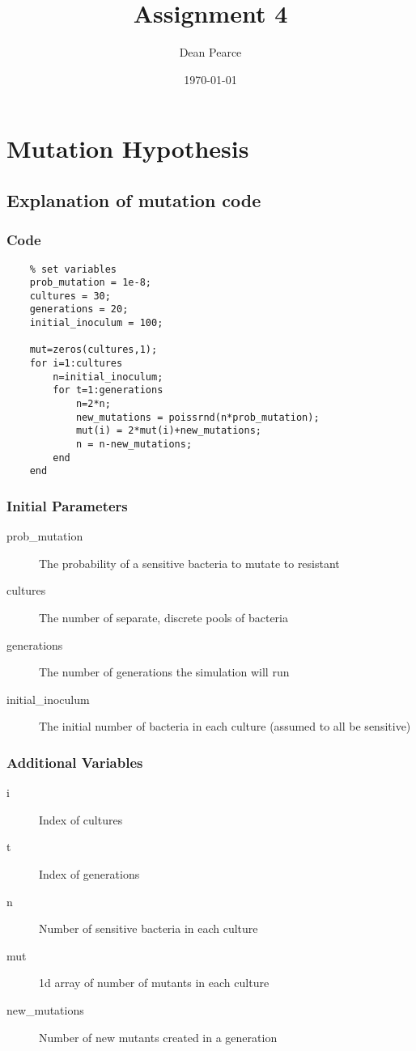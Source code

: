\documentclass[titlepage]{scrreprt}
\title{Assignment 4}
\date{\today}
\author{Dean Pearce}
\begin{document}
\maketitle
\tableofcontents
\clearpage
\chapter{Mutation Hypothesis}
\section{Explanation of mutation code}
\subsection{Code}
\begin{verbatim}
    % set variables
    prob_mutation = 1e-8;
    cultures = 30;
    generations = 20;
    initial_inoculum = 100;
    
    mut=zeros(cultures,1);
    for i=1:cultures
        n=initial_inoculum;
        for t=1:generations
            n=2*n;
            new_mutations = poissrnd(n*prob_mutation);
            mut(i) = 2*mut(i)+new_mutations;
            n = n-new_mutations;
        end
    end
\end{verbatim}

\subsection{Initial Parameters}
\begin{description}
    \item[prob\_mutation] The probability of a sensitive bacteria to mutate to resistant
    \item[cultures] The number of separate, discrete pools of bacteria
    \item[generations] The number of generations the simulation will run
    \item[initial\_inoculum] The initial number of bacteria in each culture (assumed to all be sensitive)
\end{description}
\subsection{Additional Variables}
\begin{description}
    \item[i] Index of cultures
    \item[t] Index of generations
    \item[n] Number of sensitive bacteria in each culture
    \item[mut] 1d array of number of mutants in each culture
    \item[new\_mutations] Number of new mutants created in a generation
\end{description}
\end{document}
